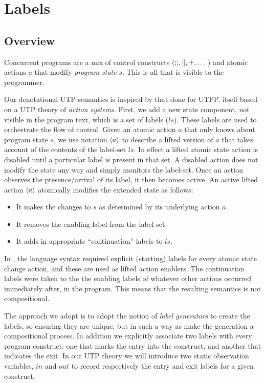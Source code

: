 \section{Labels}\label{sec:labels}

\subsection{Overview}


Concurrent programs are a mix of control constructs ($\mathbin{;\!;},\parallel,+,\dots$)
and atomic actions $a$ that modify \emph{program state} $s$.
This is all that is visible to the programmer.



Our denotational UTP semantics
is inspired by that done for UTPP\cite{DBLP:conf/icfem/WoodcockH02},
itself based on a UTP theory of \emph{action systems}.
First, we add a new state component, not visible in the program text,
which is a set of labels ($ls$).
These labels are used to orchestrate the flow of control.
Given an atomic action $a$ that only knows about program state $s$,
we use notation $\langle a\rangle$ to describe a lifted version
of $a$ that takes account of the contents of the label-set $ls$.
In effect a lifted atomic state action is disabled until
a particular label is present in that set.
A disabled action does not modify the state any way
and simply monitors the label-set.
Once an action observes the presence/arrival of its label,
it then becomes active.
An active lifted action $\langle a\rangle$ atomically modifies the extended state as follows:
\begin{itemize}
  \item It makes the changes to $s$ as determined by its underlying action $a$.
  \item It removes the enabling label from the label-set.
  \item It adds in appropriate ``continuation'' labels to $ls$.
\end{itemize}
In \cite{DBLP:conf/icfem/WoodcockH02},
the language syntax required explicit (starting) labels
for every atomic state change action,
and these are used as lifted action enablers.
The continuation labels were taken to the the enabling labels
of whatever other actions occurred immediately after, in the program.
This means that the resulting semantics is not compositional.

The approach we adopt is to adopt the notion of \emph{label generators}
to create the labels, so ensuring they are unique,
but in such a way as make the generation a compositional process.
In addition we explicitly associate two labels with every program construct:
one that marks the entry into the construct,
and another that indicates the exit.
In our UTP theory we will introduce two static observation variables,
$in$ and $out$ to record respectively the entry and exit labels
for a given construct.


